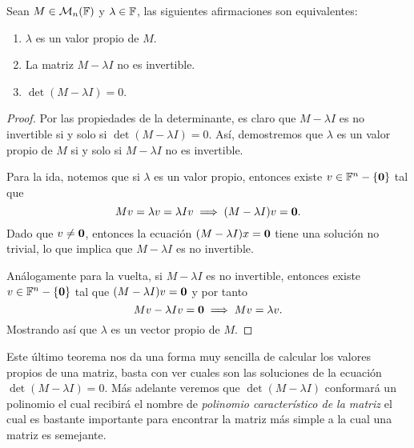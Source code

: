 \begin{teor}\label{teor:PropVP}
  Sean $M \in \mathcal{M}_n(\mathbb{F})$ y $\lambda \in \mathbb{F}$, las siguientes afirmaciones son equivalentes:
  \begin{enumerate}
    \item $\lambda$ es un valor propio de $M$.
    \item La matriz $M-\lambda I$ no es invertible.
    \item $\det(M-\lambda I) = 0$.
  \end{enumerate}
\end{teor}
\begin{proof}
  Por las propiedades de la determinante, es claro que $M-\lambda I$ es no invertible si y solo si $\det(M-\lambda I)=0$. Así, demostremos que $\lambda$ es un valor propio de $M$ si y solo si $M-\lambda I$ no es invertible.

  Para la ida, notemos que si $\lambda$ es un valor propio, entonces existe $v \in \mathbb{F}^n-\{\mathbf{0}\}$ tal que 
    \[ Mv=\lambda v = \lambda Iv \implies (M-\lambda I)v = \mathbf{0}. \]
  Dado que $v \neq \mathbf{0}$, entonces la ecuación $(M-\lambda I)x = \mathbf{0}$ tiene una solución no trivial, lo que implica que $M-\lambda I$ es no invertible.

  Análogamente para la vuelta, si $M-\lambda I$ es no invertible, entonces existe $v \in \mathbb{F}^n-\{\mathbf{0}\}$ tal que $(M-\lambda I)v = \mathbf{0}$ y por tanto
  \[ Mv - \lambda Iv = \mathbf{0} \implies Mv = \lambda v. \]
  Mostrando así que $\lambda$ es un vector propio de $M$.
\end{proof}

Este último teorema nos da una forma muy sencilla de calcular los valores propios de una matriz, basta con ver cuales son las soluciones de la ecuación $\det(M-\lambda I) = 0$. Más adelante veremos que $\det(M-\lambda I)$ conformará un polinomio el cual recibirá el nombre de \emph{polinomio característico de la matriz} el cual es bastante importante para encontrar la matriz más simple a la cual una matriz es semejante.


